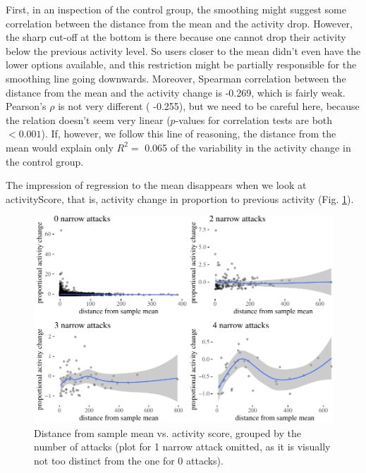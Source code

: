 \documentclass[10pt,]{scrartcl}
\begin{document}
First, in an inspection of the control group, the smoothing might
suggest some correlation between the distance from the mean and the
activity drop. However, the sharp cut-off at the bottom is there because
one cannot drop their activity below the previous activity level. So
users closer to the mean didn't even have the lower options available,
and this restriction might be partially responsible for the smoothing
line going downwards. Moreover, Spearman correlation between the
distance from the mean and the activity change is -0.269, which is
fairly weak. Pearson's \(\rho\) is not very different ( -0.255), but we
need to be careful here, because the relation doesn't seem very linear
(\(p\)-values for correlation tests are both \(<0.001\)). If, however,
we follow this line of reasoning, the distance from the mean would
explain only \(R^2 =\) 0.065 of the variability in the activity change
in the control group.

The impression of regression to the mean disappears when we look at
\textsf{activityScore}, that is, activity change in proportion to
previous activity (Fig. \ref{fig:regression2}).

\begin{figure}

\begin{center}\includegraphics[width=1\linewidth]{redditAnalysisWalkthrough_files/figure-latex/unnamed-chunk-114-1} \end{center}
\caption{Distance from sample mean vs. activity score, grouped by the number of attacks (plot for 1 narrow attack omitted, as it is visually not too distinct from the one for 0 attacks).}
\label{fig:regression2}
\end{figure}
\end{document}
